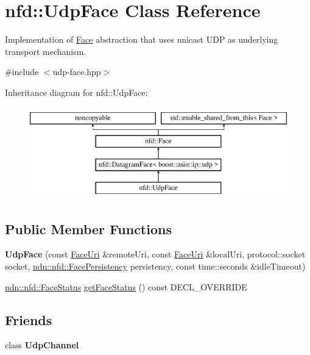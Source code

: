 \hypertarget{classnfd_1_1UdpFace}{}\section{nfd\+:\+:Udp\+Face Class Reference}
\label{classnfd_1_1UdpFace}


Implementation of \hyperlink{classnfd_1_1Face}{Face} abstraction that uses unicast U\+DP as underlying transport mechanism.  




{\ttfamily \#include $<$udp-\/face.\+hpp$>$}

Inheritance diagram for nfd\+:\+:Udp\+Face\+:\begin{figure}[H]
\begin{center}
\leavevmode
\includegraphics[height=4.000000cm]{classnfd_1_1UdpFace}
\end{center}
\end{figure}
\subsection*{Public Member Functions}
\begin{DoxyCompactItemize}
\item 
{\bfseries Udp\+Face} (const \hyperlink{classndn_1_1util_1_1FaceUri}{Face\+Uri} \&remote\+Uri, const \hyperlink{classndn_1_1util_1_1FaceUri}{Face\+Uri} \&local\+Uri, protocol\+::socket socket, \hyperlink{group__management_ga05df4b7c484a0fae25d3e65962511bac}{ndn\+::nfd\+::\+Face\+Persistency} persistency, const time\+::seconds \&idle\+Timeout)\hypertarget{classnfd_1_1UdpFace_a5f0e13cf1083f9a937960a7b2bef8a41}{}\label{classnfd_1_1UdpFace_a5f0e13cf1083f9a937960a7b2bef8a41}

\item 
\hyperlink{classndn_1_1nfd_1_1FaceStatus}{ndn\+::nfd\+::\+Face\+Status} \hyperlink{classnfd_1_1UdpFace_ad914a7f6b37b7da25a5246e23461b402}{get\+Face\+Status} () const D\+E\+C\+L\+\_\+\+O\+V\+E\+R\+R\+I\+DE
\end{DoxyCompactItemize}
\subsection*{Friends}
\begin{DoxyCompactItemize}
\item 
class {\bfseries Udp\+Channel}\hypertarget{classnfd_1_1UdpFace_a348056e43e76dd8e7f2b8e093a08b7e9}{}\label{classnfd_1_1UdpFace_a348056e43e76dd8e7f2b8e093a08b7e9}

\end{DoxyCompactItemize}
